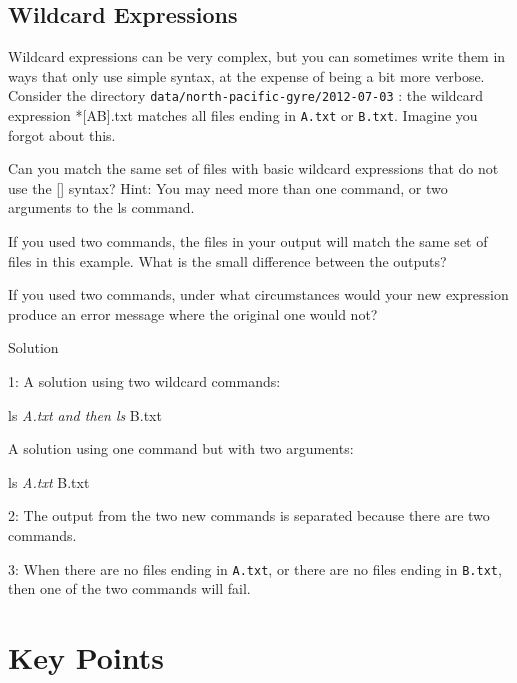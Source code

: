 \documentclass[
]{book}
\begin{document}
\subsection{Wildcard Expressions}\label{wildcard-expressions}

Wildcard expressions can be very complex, but you can sometimes write them in ways that only use simple syntax, at the expense of being a bit more verbose. Consider the directory \texttt{data/north-pacific-gyre/2012-07-03} : the wildcard expression *{[}AB{]}.txt matches all files ending in \texttt{A.txt} or \texttt{B.txt}. Imagine you forgot about this.

Can you match the same set of files with basic wildcard expressions that do not use the {[}{]} syntax? Hint: You may need more than one command, or two arguments to the ls command.

If you used two commands, the files in your output will match the same set of files in this example. What is the small difference between the outputs?

If you used two commands, under what circumstances would your new expression produce an error message where the original one would not?

Solution

1: A solution using two wildcard commands:

ls \emph{A.txt and then ls }B.txt

A solution using one command but with two arguments:

ls \emph{A.txt }B.txt

2: The output from the two new commands is separated because there are two commands.

3: When there are no files ending in \texttt{A.txt}, or there are no files ending in \texttt{B.txt}, then one of the two commands will fail.

\section{Key Points}\label{key-points}
\end{document}
